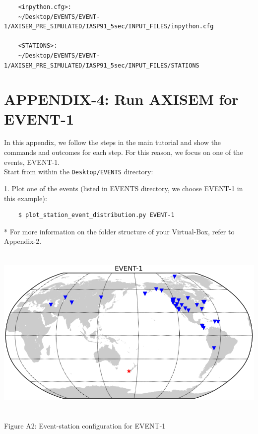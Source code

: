 \documentclass{article}
\begin{document}
\begin{verbatim}
    <inpython.cfg>: 
    ~/Desktop/EVENTS/EVENT-1/AXISEM_PRE_SIMULATED/IASP91_5sec/INPUT_FILES/inpython.cfg
    
    <STATIONS>:
    ~/Desktop/EVENTS/EVENT-1/AXISEM_PRE_SIMULATED/IASP91_5sec/INPUT_FILES/STATIONS
\end{verbatim}

\newpage

\section{APPENDIX-4: Run AXISEM for EVENT-1}

In this appendix, we follow the steps in the main tutorial and show the commands 
and outcomes for each step. For this reason, we focus on one of the events, EVENT-1. \\

Start from within the \verb|Desktop/EVENTS| directory:

1. Plot one of the events (listed in EVENTS directory, we choose EVENT-1 in this example):
\begin{verbatim}
    $ plot_station_event_distribution.py EVENT-1
\end{verbatim}
* For more information on the folder structure of your Virtual-Box, refer to Appendix-2.

\begin{center}
\includegraphics[width=444pt, height=240pt, keepaspectratio=true]{AXISEMTutorial-fig006.png}

{\small{}Figure A2: Event-station configuration for EVENT-1}
\end{center}
\end{document}
